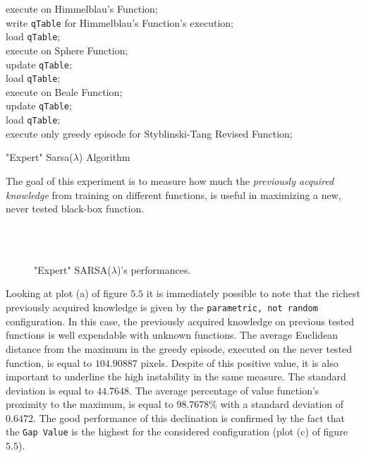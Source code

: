 \begin{algorithm} [h!]

 {
	{execute on Himmelblau's Function; \\
		write {\tt qTable} for Himmelblau's Function's execution; \\
		load {\tt qTable}; \\
		execute on Sphere Function; \\
		update {\tt qTable}; \\
		load {\tt qTable}; \\
		execute on Beale Function; \\
		update {\tt qTable}; \\
		load {\tt qTable}; \\
		execute only greedy episode for Styblinski-Tang Revised Function;
	} 
}
	\caption{"Expert" Sarsa($\lambda$) Algorithm} 
	\label{ExpertAlgo}
\end{algorithm}
 
The goal of this experiment is to measure how much the \textit{previously acquired knowledge} from training on different functions, is useful in maximizing a new, never tested black-box function.

\begin{figure}[h!]
	\begin{center}
		\\
		 \\
		
	\end{center}
	\caption{
		"Expert" SARSA($\lambda$)'s  performances.
	}
	\label{fig:ExpertResults}
\end{figure}

Looking at plot (a) of figure $5.5$ it is immediately possible to note that the richest previously acquired knowledge is given by the {\tt parametric, not random} configuration. In this case, the previously acquired knowledge on previous tested functions is well expendable with unknown functions. The average Euclidean distance from the maximum in the greedy episode, executed on the never tested function, is equal to $104.90887$ pixels. Despite of this positive value, it is also important to underline the high instability in the same measure. The standard deviation is equal to $44.7648$. The average percentage of value function's proximity to the maximum, is  equal to $98.7678\%$ with a standard deviation of $0.6472$. The good performance of this declination is confirmed by the fact that the {\tt Gap Value} is the highest for the considered configuration (plot (c) of figure $5.5$). 

